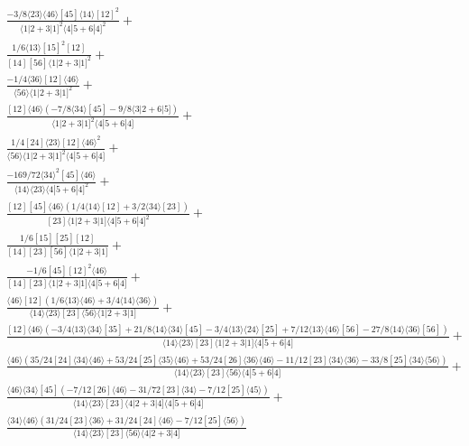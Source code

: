 \documentclass[varwidth, border=5pt]{standalone}
\begin{document}
\begin{my}
$\begin{gathered}
\scriptscriptstyle\frac{-3/8⟨23⟩⟨46⟩[45]⟨14⟩[12]^2}{⟨1|2+3|1]^2⟨4|5+6|4]^2}+\\
\scriptscriptstyle\frac{1/6⟨13⟩[15]^2[12]}{[14][56]⟨1|2+3|1]^2}+\\
\scriptscriptstyle\frac{-1/4⟨36⟩[12]⟨46⟩}{⟨56⟩⟨1|2+3|1]^2}+\\
\scriptscriptstyle\frac{[12]⟨46⟩\scriptscriptstyle(-7/8⟨34⟩[45]-9/8⟨3|2+6|5])}{⟨1|2+3|1]^2⟨4|5+6|4]}+\\
\scriptscriptstyle\frac{1/4[24]⟨23⟩[12]⟨46⟩^2}{⟨56⟩⟨1|2+3|1]^2⟨4|5+6|4]}+\\
\scriptscriptstyle\frac{-169/72⟨34⟩^2[45]⟨46⟩}{⟨14⟩⟨23⟩⟨4|5+6|4]^2}+\\
\scriptscriptstyle\frac{[12][45]⟨46⟩\scriptscriptstyle(1/4⟨14⟩[12]+3/2⟨34⟩[23])}{[23]⟨1|2+3|1]⟨4|5+6|4]^2}+\\
\scriptscriptstyle\frac{1/6[15][25][12]}{[14][23][56]⟨1|2+3|1]}+\\
\scriptscriptstyle\frac{-1/6[45][12]^2⟨46⟩}{[14][23]⟨1|2+3|1]⟨4|5+6|4]}+\\
\scriptscriptstyle\frac{⟨46⟩[12]\scriptscriptstyle(1/6⟨13⟩⟨46⟩+3/4⟨14⟩⟨36⟩)}{⟨14⟩⟨23⟩[23]⟨56⟩⟨1|2+3|1]}+\\
\scriptscriptstyle\frac{[12]⟨46⟩\scriptscriptstyle(-3/4⟨13⟩⟨34⟩[35]+21/8⟨14⟩⟨34⟩[45]-3/4⟨13⟩⟨24⟩[25]+7/12⟨13⟩⟨46⟩[56]-27/8⟨14⟩⟨36⟩[56])}{⟨14⟩⟨23⟩[23]⟨1|2+3|1]⟨4|5+6|4]}+\\
\scriptscriptstyle\frac{⟨46⟩\scriptscriptstyle(35/24[24]⟨34⟩⟨46⟩+53/24[25]⟨35⟩⟨46⟩+53/24[26]⟨36⟩⟨46⟩-11/12[23]⟨34⟩⟨36⟩-33/8[25]⟨34⟩⟨56⟩)}{⟨14⟩⟨23⟩[23]⟨56⟩⟨4|5+6|4]}+\\
\scriptscriptstyle\frac{⟨46⟩⟨34⟩[45]\scriptscriptstyle(-7/12[26]⟨46⟩-31/72[23]⟨34⟩-7/12[25]⟨45⟩)}{⟨14⟩⟨23⟩[23]⟨4|2+3|4]⟨4|5+6|4]}+\\
\scriptscriptstyle\frac{⟨34⟩⟨46⟩\scriptscriptstyle(31/24[23]⟨36⟩+31/24[24]⟨46⟩-7/12[25]⟨56⟩)}{⟨14⟩⟨23⟩[23]⟨56⟩⟨4|2+3|4]}\phantom{+}
\end{gathered}$
\end{my}
\end{document}

